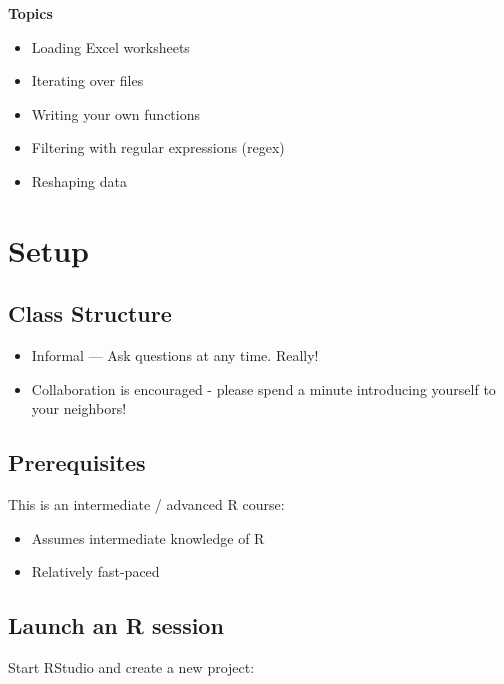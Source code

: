\documentclass[
]{book}
\providecommand{\tightlist}{%
  \setlength{\itemsep}{0pt}\setlength{\parskip}{0pt}}
\begin{document}
\textbf{Topics}

\begin{itemize}
\tightlist
\item
  Loading Excel worksheets
\item
  Iterating over files
\item
  Writing your own functions
\item
  Filtering with regular expressions (regex)
\item
  Reshaping data
\end{itemize}

\hypertarget{setup-3}{%
\section{Setup}\label{setup-3}}

\hypertarget{class-structure-3}{%
\subsection{Class Structure}\label{class-structure-3}}

\begin{itemize}
\tightlist
\item
  Informal --- Ask questions at any time. Really!
\item
  Collaboration is encouraged - please spend a minute introducing yourself to your neighbors!
\end{itemize}

\hypertarget{prerequisites-3}{%
\subsection{Prerequisites}\label{prerequisites-3}}

This is an intermediate / advanced R course:

\begin{itemize}
\tightlist
\item
  Assumes intermediate knowledge of R
\item
  Relatively fast-paced
\end{itemize}

\hypertarget{launch-an-r-session-2}{%
\subsection{Launch an R session}\label{launch-an-r-session-2}}

Start RStudio and create a new project:
\end{document}
